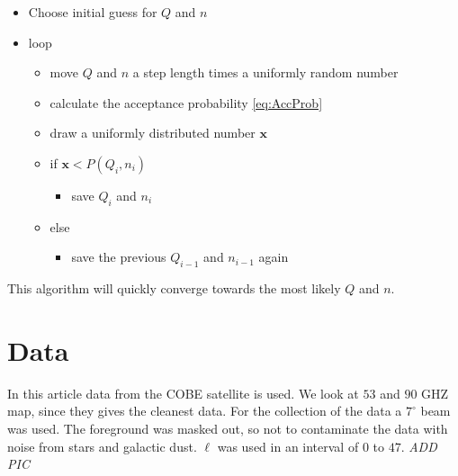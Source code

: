 \documentclass{emulateapj}
\begin{document}
\begin{itemize}
\item Choose initial guess for $Q$ and $n$
\item loop
    \begin{itemize}
     \item move $Q$ and $n$ a step length times a uniformly random number
     \item calculate the acceptance probability \eqref{eq:AccProb}
     \item draw a uniformly distributed number $\mathbf{x}$
     \item if $\mathbf{x} < P(Q_i,n_i)$
     \begin{itemize}
     \item save $Q_i$ and $n_i$
     \end{itemize}
     \item else
     \begin{itemize}
     \item save the previous $Q_{i-1}$ and $n_{i-1}$ again
     \end{itemize}
     \end{itemize}
\end{itemize}

This algorithm will quickly converge towards the most likely $Q$ and $n$.




%
%

\section{Data}
\label{sec:data}

In this article data from the COBE satellite is used. We look at $53$ and $90$ GHZ map, since they gives the cleanest data. For the collection of the data a $7^{\circ}$ beam was used. The foreground was masked out, so not to contaminate the data with noise from stars and galactic dust. $\ell$ was used in an interval of $0$ to $47$. \emph{ADD PIC}


%
\end{document}
